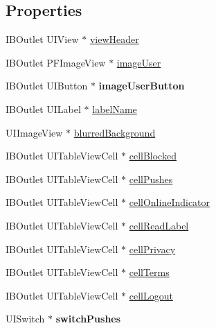 \subsection*{Properties}
\begin{DoxyCompactItemize}
\item 
I\+B\+Outlet U\+I\+View $\ast$ \hyperlink{category_e_s_settings_view_07_08_acf033cccb7b67db231b0cd5d7b7a79c5}{view\+Header}
\item 
I\+B\+Outlet P\+F\+Image\+View $\ast$ \hyperlink{category_e_s_settings_view_07_08_a085505d50a3d26b8ac992212b58b378d}{image\+User}
\item 
\hypertarget{category_e_s_settings_view_07_08_af04b010a3ddc78843d65e0b42253563e}{}I\+B\+Outlet U\+I\+Button $\ast$ {\bfseries image\+User\+Button}\label{category_e_s_settings_view_07_08_af04b010a3ddc78843d65e0b42253563e}

\item 
I\+B\+Outlet U\+I\+Label $\ast$ \hyperlink{category_e_s_settings_view_07_08_a5437b42a935c42e721853206c9b13748}{label\+Name}
\item 
U\+I\+Image\+View $\ast$ \hyperlink{category_e_s_settings_view_07_08_aa10e5da12de467917791adfac7366092}{blurred\+Background}
\item 
I\+B\+Outlet U\+I\+Table\+View\+Cell $\ast$ \hyperlink{category_e_s_settings_view_07_08_a6368189e302b5147c599dac362063c2d}{cell\+Blocked}
\item 
I\+B\+Outlet U\+I\+Table\+View\+Cell $\ast$ \hyperlink{category_e_s_settings_view_07_08_aea2e270b3e0dc217c754e06d13af1630}{cell\+Pushes}
\item 
I\+B\+Outlet U\+I\+Table\+View\+Cell $\ast$ \hyperlink{category_e_s_settings_view_07_08_a5fba80efa79471671331b5418d2bfd60}{cell\+Online\+Indicator}
\item 
I\+B\+Outlet U\+I\+Table\+View\+Cell $\ast$ \hyperlink{category_e_s_settings_view_07_08_a882b94f63ca9dc1f83033b8614df7c4d}{cell\+Read\+Label}
\item 
I\+B\+Outlet U\+I\+Table\+View\+Cell $\ast$ \hyperlink{category_e_s_settings_view_07_08_a54641bc5342c531fc56d4b0d478d3d92}{cell\+Privacy}
\item 
I\+B\+Outlet U\+I\+Table\+View\+Cell $\ast$ \hyperlink{category_e_s_settings_view_07_08_afbe8cfe1c7ec9b5f92326e693d916ed0}{cell\+Terms}
\item 
I\+B\+Outlet U\+I\+Table\+View\+Cell $\ast$ \hyperlink{category_e_s_settings_view_07_08_a44497b402b0eaf22eaaabc34059d3690}{cell\+Logout}
\item 
\hypertarget{category_e_s_settings_view_07_08_ae61357d8bad9fc73cc1fe8371e3bad79}{}U\+I\+Switch $\ast$ {\bfseries switch\+Pushes}\label{category_e_s_settings_view_07_08_ae61357d8bad9fc73cc1fe8371e3bad79}


\end{DoxyCompactItemize}
